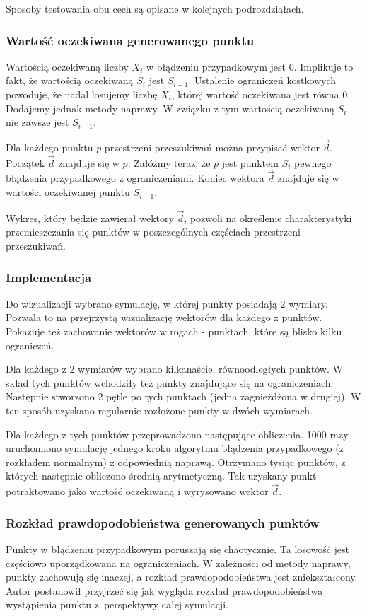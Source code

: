 \documentclass{mini}
\begin{document}
Sposoby testowania obu cech są opisane w kolejnych podrozdziałach.

\subsubsection{Wartość oczekiwana generowanego punktu}
Wartością oczekiwaną liczby $X_i$ w błądzeniu przypadkowym jest 0. Implikuje to fakt, że wartością oczekiwaną $S_i$ jest $S_{i-1}$. Ustalenie ograniczeń kostkowych powoduje, że nadal losujemy liczbę $X_i$, której wartość oczekiwana jest równa 0. Dodajemy jednak metody naprawy. W związku z tym wartością oczekiwaną $S_i$ nie zawsze jest $S_{i-1}$.

Dla każdego punktu $p$ przestrzeni przeszukiwań można przypisać wektor $\overrightarrow{d}$. Początek $\overrightarrow{d}$ znajduje się w $p$. Załóżmy teraz, że $p$ jest punktem $S_i$ pewnego błądzenia przypadkowego z ograniczeniami. Koniec wektora $\overrightarrow{d}$ znajduje się w wartości oczekiwanej punktu $S_{i+1}$.

Wykres, który będzie zawierał wektory $\overrightarrow{d}$, pozwoli na określenie charakterystyki przemieszczania się punktów w poszczególnych częściach przestrzeni przeszukiwań.

\subsubsection*{Implementacja}
Do wizualizacji wybrano symulację, w której punkty posiadają 2 wymiary. Pozwala to na przejrzystą wizualizację wektorów dla każdego z punktów. Pokazuje też zachowanie wektorów w rogach - punktach, które są blisko kilku ograniczeń.

Dla każdego z 2 wymiarów wybrano kilkanaście, równoodległych punktów. W skład tych punktów wchodziły też punkty znajdujące się na ograniczeniach. Następnie stworzono 2 pętle po tych punktach (jedna zagnieżdżona w drugiej). W ten sposób uzyskano regularnie rozłożone punkty w dwóch wymiarach.

Dla każdego z tych punktów przeprowadzono następujące obliczenia. 1000 razy uruchomiono symulację jednego kroku algorytmu błądzenia przypadkowego (z rozkładem normalnym) z odpowiednią naprawą. Otrzymano tysiąc punktów, z których następnie obliczono średnią arytmetyczną. Tak uzyskany punkt potraktowano jako wartość oczekiwaną i wyrysowano wektor $\overrightarrow{d}$.

\subsubsection{Rozkład prawdopodobieństwa generowanych punktów}
Punkty w błądzeniu przypadkowym poruszają się chaotycznie. Ta losowość jest częściowo uporządkowana na ograniczeniach. W zależności od metody naprawy, punkty zachowują się inaczej, a rozkład prawdopodobieństwa jest zniekształcony. Autor postanowił przyjrzeć się jak wygląda rozkład prawdopodobieństwa wystąpienia punktu z~perspektywy całej symulacji.
\end{document}
